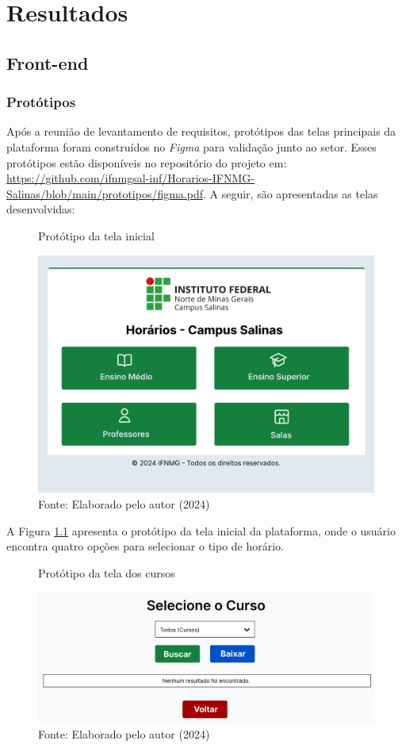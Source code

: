 \chapter{Resultados} 
\label{cap5_resultados}

\section{Front-end}

\subsection{Protótipos}

Após a reunião de levantamento de requisitos, protótipos das telas principais da plataforma foram construídos no \textit{Figma} para validação junto ao setor. Esses protótipos estão disponíveis no repositório do projeto em: \url{https://github.com/ifnmgsal-inf/Horarios-IFNMG-Salinas/blob/main/prototipos/figma.pdf}. A seguir, são apresentadas as telas desenvolvidas:

\begin{figure}[htb]
    \centering
    \caption{Protótipo da tela inicial}
    \includegraphics[width=1\textwidth]{Figuras/proto-1.png}
    \caption*{Fonte: Elaborado pelo autor (2024)}
    \label{fig_proto_1}
\end{figure}

A Figura \ref{fig_proto_1} apresenta o protótipo da tela inicial da plataforma, onde o usuário encontra quatro opções para selecionar o tipo de horário.

\begin{figure}[H]
    \centering
    \caption{Protótipo da tela dos cursos}
    \includegraphics[width=1\textwidth]{Figuras/proto-2.PNG}
    \caption*{Fonte: Elaborado pelo autor (2024)}
    \label{fig_proto_2}
\end{figure}

